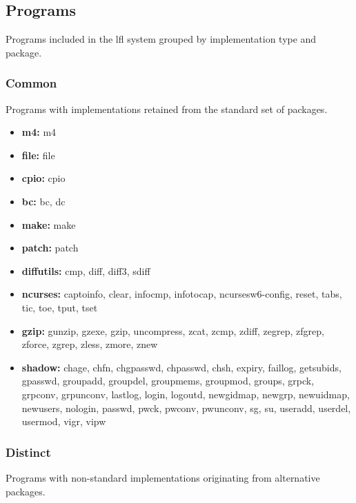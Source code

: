 \subsection{Programs}\label{Programs}

Programs included in the \gls{lfl} system grouped by implementation type and package.

\subsubsection{Common}

Programs with implementations retained from the standard set of packages.

\begin{itemize}
    \item \textbf{m4:} m4
    \item \textbf{file:} file
    \item \textbf{cpio:} cpio
    \item \textbf{bc:} bc, dc
    \item \textbf{make:} make
    \item \textbf{patch:} patch
    \item \textbf{diffutils:} cmp, diff, diff3, sdiff
    \item \textbf{ncurses:} captoinfo, clear, infocmp, infotocap, ncursesw6-config, reset, tabs, tic, toe, tput, tset
    \item \textbf{gzip:} gunzip, gzexe, gzip, uncompress, zcat, zcmp, zdiff, zegrep, zfgrep, zforce, zgrep, zless, zmore, znew
    \item \textbf{shadow:} chage, chfn, chgpasswd, chpasswd, chsh, expiry, faillog, getsubids, gpasswd, groupadd, groupdel, groupmems, groupmod, groups, grpck, grpconv, grpunconv, lastlog, login, logoutd, newgidmap, newgrp, newuidmap, newusers, nologin, passwd, pwck, pwconv, pwunconv, sg, su, useradd, userdel, usermod, vigr, vipw
\end{itemize}

\subsubsection{Distinct}

Programs with non-standard implementations originating from alternative packages.

